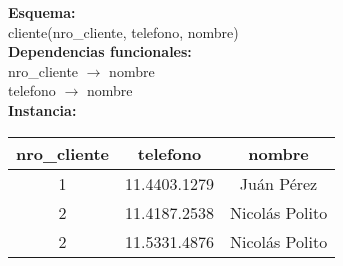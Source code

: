 \documentclass[preview]{standalone}
\begin{document}
\textbf{Esquema:}\\
cliente(nro\_cliente, telefono, nombre)\\

\textbf{Dependencias funcionales:}\\
nro\_cliente $\rightarrow$ nombre\\
telefono $\rightarrow$ nombre\\

\textbf{Instancia:}\\
\begin{tabular}{ | c | c | c |}
  \hline			
  nro\_cliente & telefono & nombre \\
  \hline			
  1 & 11.4403.1279 & Ju\'an P\'erez \\
  2 & 11.4187.2538 & Nicol\'as Polito \\
  2 & 11.5331.4876 & Nicol\'as Polito \\
  \hline  
\end{tabular}
\end{document}
